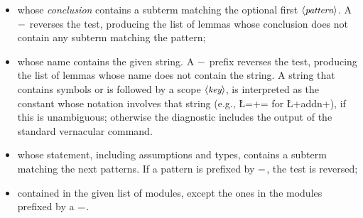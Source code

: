 \begin{itemize}
\item whose \emph{conclusion} contains a subterm matching the optional
  first $\langle\mbox{\itshape\rmfamily\small pattern}\rangle$. A $\C{-}$ reverses the test, producing the list
  of lemmas whose conclusion does not contain any subterm matching
  the pattern;
\item whose name contains the given string. A $\C{-}$ prefix reverses
  the test, producing the list of lemmas whose name does not contain the
  string. A string that contains symbols or
is followed by a scope $\langle\mbox{\itshape\rmfamily\small key}\rangle$, is interpreted as the constant whose
notation involves that string (e.g., \L=+= for \L+addn+), if this is
unambiguous; otherwise the diagnostic includes the output of the
 standard vernacular command.

\item whose statement, including assumptions and types, contains a
  subterm matching the next patterns. If a pattern is prefixed by
  $\C{-}$, the test is reversed;
\item contained in the given list of modules, except the ones in the
  modules prefixed by a $\C{-}$.
\end{itemize}

